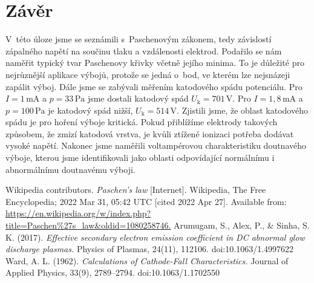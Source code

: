 \documentclass[a4paper,12pt]{article}
\begin{document}
\clearpage
\section{Závěr}
V~této úloze jsme se seznámili s~Paschenovým zákonem, tedy závislostí zápalného 
napětí na součinu tlaku a vzdálenosti elektrod. Podařilo se nám naměřit typický 
tvar Paschenovy křivky včetně jejího minima. To je důležité pro nejrůznější 
aplikace výbojů, protože se jedná o~bod, ve kterém lze nejsnázeji zapálit výboj.
Dále jsme se zabývali měřením katodového spádu potenciálu. Pro 
$I = 1\,\si{\milli\ampere}$ a $p = 33\,\si{\pascal}$ jsme dostali katodový spád 
$U_\text{k} = 701\,\si{\volt}$. Pro $I = 1,8\,\si{\milli\ampere}$ a $p = 
100\,\si{\pascal}$ je katodový spád nižší,  $U_\text{k} = 514\,\si{\volt}$. 
Zjistili jsme, že oblast katodového spádu je pro hoření výboje kritická. Pokud 
přiblížíme elektrody takových způsobem, že zmizí katodová vrstva, je kvůli 
ztížené ionizaci potřeba dodávat vysoké napětí. Nakonec jsme 
naměřili voltampérovou charakteristiku doutnavého výboje, kterou jsme 
identifikovali jako oblasti odpovídající normálnímu i abnormálnímu doutnavému 
výboji.

\begin{thebibliography}{10}
	Wikipedia contributors. \textit{Paschen's law} [Internet]. Wikipedia, The 
	Free 
	Encyclopedia; 2022 Mar 31, 05:42 UTC [cited 2022 Apr 27]. Available from: 
	\url{https://en.wikipedia.org/w/index.php?title=Paschen%27s_law&oldid=1080258746.}
	Arumugam, S., Alex, P., \& Sinha, S. K. (2017). \textit{Effective secondary 
	electron emission coefficient in DC abnormal glow discharge plasmas.} 
	Physics of Plasmas, 24(11), 112106. doi:10.1063/1.4997622 
	Ward, A. L. (1962). \textit{Calculations of Cathode-Fall Characteristics.} 
	Journal 	of Applied Physics, 33(9), 2789–2794. doi:10.1063/1.1702550 
\end{thebibliography}
\end{document}
